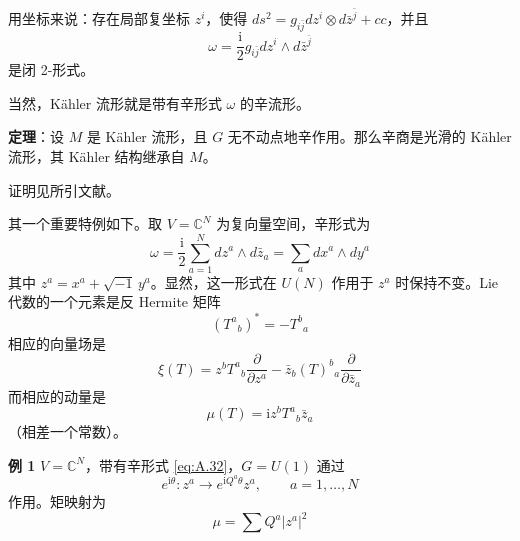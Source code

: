 用坐标来说：存在局部复坐标 $z^i$，使得 $ds^2=g_{i\bar{j}}dz^i\otimes d\bar{z}^{\bar{j}}+cc$，并且
\begin{equation}
  \omega=\frac{\mathrm{i}}{2}g_{i\bar{j}}dz^i\wedge d\bar{z}^{\bar{j}}
  \tag{A.31}
  \label{eq:A.31}
\end{equation}
是闭 2-形式。

当然，Kähler 流形就是带有辛形式 $\omega$ 的辛流形。

\textbf{定理}：设 $M$ 是 Kähler 流形，且 $G$ 无不动点地辛作用。那么辛商是光滑的 Kähler 流形，其 Kähler 结构继承自 $M$。

证明见所引文献。

其一个重要特例如下。取 $V=\mathbb{C}^N$ 为复向量空间，辛形式为
\begin{equation}
  \omega=\frac{\mathrm{i}}{2}\sum_{a=1}^{N}dz^a\wedge d\bar{z}_a=\sum_a dx^a\wedge dy^a
  \tag{A.32}
  \label{eq:A.32}
\end{equation}
其中 $z^a=x^a+\sqrt{-1}\,y^a$。显然，这一形式在 $U(N)$ 作用于 $z^a$ 时保持不变。Lie 代数的一个元素是反 Hermite 矩阵
\begin{equation}
  (T^a{}_b)^{*}=-T^b{}_a
  \tag{A.33}
  \label{eq:A.33}
\end{equation}
相应的向量场是
\begin{equation}
  \xi(T)=z^bT^a{}_b\frac{\partial}{\partial z^a}-\bar{z}_b(T)^b{}_a\frac{\partial}{\partial\bar{z}_a}
  \tag{A.34}
  \label{eq:A.34}
\end{equation}
而相应的动量是
\begin{equation}
  \mu(T)=\mathrm{i}z^bT^a{}_b\bar{z}_a
  \tag{A.35}
  \label{eq:A.35}
\end{equation}
（相差一个常数）。

\textbf{例 1} $V=\mathbb{C}^N$，带有辛形式 \eqref{eq:A.32}，$G=U(1)$ 通过
\begin{equation}
  e^{\mathrm{i}\theta}:z^a\to e^{\mathrm{i}Q^a\theta}z^a,\qquad a=1,\dots,N
  \tag{A.36}
  \label{eq:A.36}
\end{equation}
作用。矩映射为
\begin{equation}
  \mu=\sum Q^a|z^a|^2
  \tag{A.37}
  \label{eq:A.37}
\end{equation}

